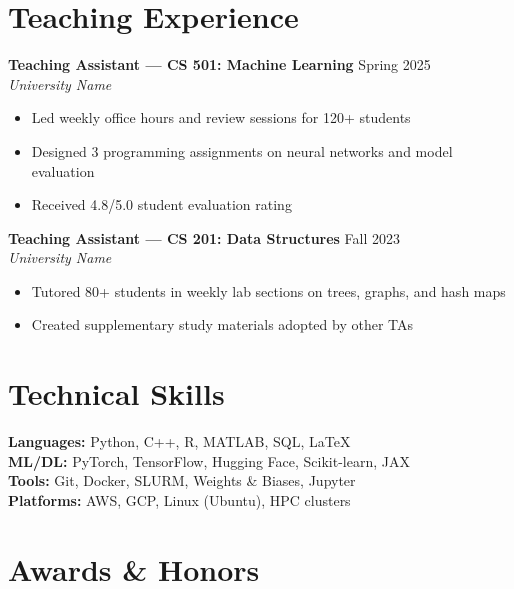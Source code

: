 \documentclass[11pt,letterpaper]{article}
\begin{document}
\section{Teaching Experience}

\textbf{Teaching Assistant — CS 501: Machine Learning} \hfill Spring 2025 \\
\textit{University Name}
\begin{itemize}
    \item Led weekly office hours and review sessions for 120+ students
    \item Designed 3 programming assignments on neural networks and model evaluation
    \item Received 4.8/5.0 student evaluation rating
\end{itemize}

\vspace{4pt}
\textbf{Teaching Assistant — CS 201: Data Structures} \hfill Fall 2023 \\
\textit{University Name}
\begin{itemize}
    \item Tutored 80+ students in weekly lab sections on trees, graphs, and hash maps
    \item Created supplementary study materials adopted by other TAs
\end{itemize}

\section{Technical Skills}

\textbf{Languages:} Python, C++, R, MATLAB, SQL, LaTeX \\
\textbf{ML/DL:} PyTorch, TensorFlow, Hugging Face, Scikit-learn, JAX \\
\textbf{Tools:} Git, Docker, SLURM, Weights \& Biases, Jupyter \\
\textbf{Platforms:} AWS, GCP, Linux (Ubuntu), HPC clusters

\section{Awards \& Honors}
\end{document}
